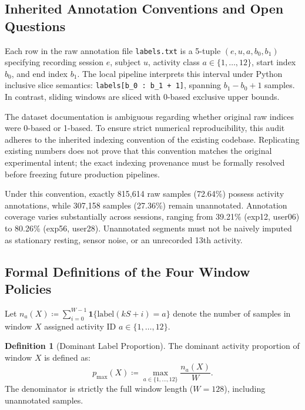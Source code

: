 \documentclass[11pt,a4paper]{article}
\newcommand{\code}[1]{{\small\ttfamily\nolinkurl{#1}}}
\theoremstyle{definition}
\newtheorem{definition}[proposition]{Definition}
\begin{document}
\subsection{Inherited Annotation Conventions and Open Questions}
Each row in the raw annotation file \code{labels.txt} is a 5-tuple $(e, u, a, b_0, b_1)$ specifying recording session $e$, subject $u$, activity class $a \in \{1, \ldots, 12\}$, start index $b_0$, and end index $b_1$. The local pipeline interprets this interval under Python inclusive slice semantics: \code{labels[b_0 : b_1 + 1]}, spanning $b_1 - b_0 + 1$ samples. In contrast, sliding windows are sliced with 0-based exclusive upper bounds.

The dataset documentation is ambiguous regarding whether original raw indices were 0-based or 1-based. To ensure strict numerical reproducibility, this audit adheres to the inherited indexing convention of the existing codebase. Replicating existing numbers does not prove that this convention matches the original experimental intent; the exact indexing provenance must be formally resolved before freezing future production pipelines.

Under this convention, exactly 815,614 raw samples (72.64\%) possess activity annotations, while 307,158 samples (27.36\%) remain unannotated. Annotation coverage varies substantially across sessions, ranging from 39.21\% (exp12, user06) to 80.26\% (exp56, user28). Unannotated segments must not be naively imputed as stationary resting, sensor noise, or an unrecorded 13th activity.

\subsection{Formal Definitions of the Four Window Policies}
Let $n_a(X) \coloneqq \sum_{i=0}^{W-1} \mathbf{1}\{\text{label}(kS + i) = a\}$ denote the number of samples in window $X$ assigned activity ID $a \in \{1, \ldots, 12\}$.

\begin{definition}[Dominant Label Proportion]
The dominant activity proportion of window $X$ is defined as:
\begin{equation}
p_{\max}(X) \coloneqq \max_{a \in \{1, \ldots, 12\}} \frac{n_a(X)}{W}.
\end{equation}
The denominator is strictly the full window length ($W = 128$), including unannotated samples.
\end{definition}
\end{document}
